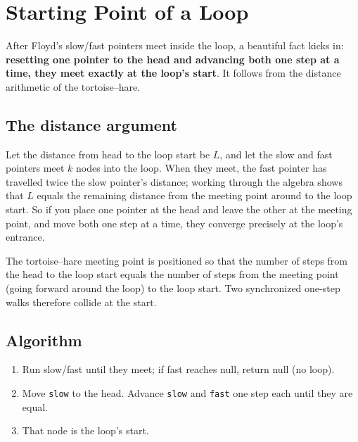 \section{Starting Point of a Loop}
\label{sec:ll-loop-start}


\begin{patternbox}
After Floyd's slow/fast pointers meet inside the loop, a beautiful fact
kicks in: \textbf{resetting one pointer to the head and advancing both one
step at a time, they meet exactly at the loop's start}. It follows from the
distance arithmetic of the tortoise--hare.
\end{patternbox}

\subsection*{The distance argument}

Let the distance from head to the loop start be $L$, and let the slow and
fast pointers meet $k$ nodes into the loop. When they meet, the fast
pointer has travelled twice the slow pointer's distance; working through the
algebra shows that $L$ equals the remaining distance from the meeting point
around to the loop start. So if you place one pointer at the head and leave
the other at the meeting point, and move both one step at a time, they
converge precisely at the loop's entrance.

\begin{ideabox}
The tortoise--hare meeting point is positioned so that the number of steps
from the head to the loop start equals the number of steps from the meeting
point (going forward around the loop) to the loop start. Two synchronized
one-step walks therefore collide at the start.
\end{ideabox}

\subsection*{Algorithm}

\begin{enumerate}
  \item Run slow/fast until they meet; if fast reaches null, return null (no
        loop).
  \item Move \texttt{slow} to the head. Advance \texttt{slow} and
        \texttt{fast} one step each until they are equal.
  \item That node is the loop's start.
\end{enumerate}

